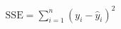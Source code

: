 \documentclass[preview]{standalone}
\begin{document}
\begin{align*}
\text{SSE} = \sum_{i=1}^{n} (y_i - \hat{y}_i)^2
\end{align*}
\end{document}
